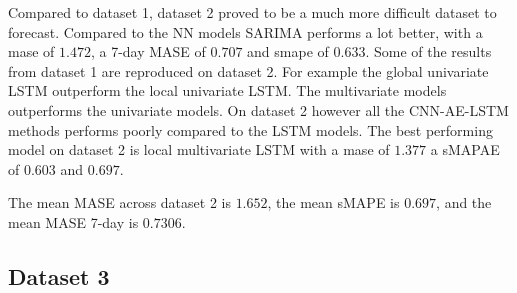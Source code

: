 Compared to dataset 1, dataset 2 proved to be a much more difficult dataset to forecast.
Compared to the NN models SARIMA performs a lot better, with a mase of $1.472$, a 7-day MASE of $0.707$ and smape of $0.633$.
Some of the results from dataset 1 are reproduced on dataset 2. For example the global univariate LSTM outperform
the local univariate LSTM. The multivariate models outperforms the univariate models.
On dataset 2 however all the CNN-AE-LSTM methods performs poorly compared to the LSTM models.
The best performing model on dataset 2 is local multivariate LSTM with a mase of $1.377$ a sMAPAE of $0.603$
and $0.697$.

The mean MASE across dataset 2 is $1.652$,
the mean sMAPE is $0.697$,
and the mean MASE 7-day is  $0.7306$.

\subsection{Dataset 3}

